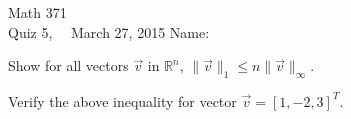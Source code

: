 \documentclass[addpoints, 11pt]{exam}
\begin{document}
Math 371 \\
Quiz 5, \ \ March 27, 2015
\hspace{2.in}
{Name:} {\underline {\hspace{2.15in}}} \\ \normalsize
\begin{questions}

\question Show for all vectors $\vec{v}$ in $\mathbb{R}^n$, $\|\vec{v}\|_1 \leq n \|\vec{v}\|_{\infty}$.
\vfill

\question Verify the above inequality for vector $\vec{v}=[1, -2, 3]^T$.
\vfill

\end{questions}
\end{document}
